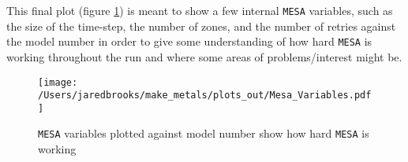 \documentclass{article}
\begin{document}
        \pagebreak

        This final plot (figure \ref{fig:7}) is meant to show a few internal \texttt{MESA} variables, such as the size of the time-step, the number of zones, and the number of retries against the model number in order to give some understanding of how hard \texttt{MESA} is working throughout the run and where some areas of problems/interest might be.

        \begin{figure}[H]
                \centering
                \texttt{[image: /Users/jaredbrooks/make\_metals/plots\_out/Mesa\_Variables.pdf]}
                \caption{\texttt{MESA} variables plotted against model number show how hard \texttt{MESA} is working}
                \label{fig:7}
        \end{figure}
\end{document}

